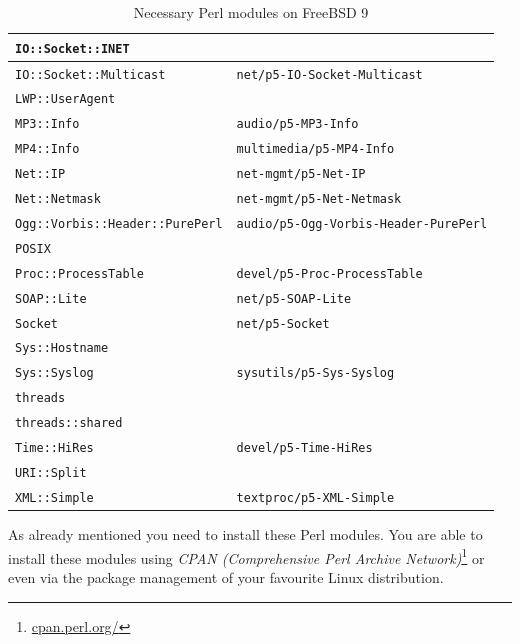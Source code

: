 \documentclass[a4paper,oneside,10pt]{report}
\begin{document}
\begin{table}
\begin{tabular}{|p{15em}|p{18em}|}
		\hline
		\verb|IO::Socket::INET| 							& \\
		\hline
		\verb|IO::Socket::Multicast| 					& \verb|net/p5-IO-Socket-Multicast| \\
		\hline
		\verb|LWP::UserAgent| 								& \\
		\hline
		\verb|MP3::Info| 											& \verb|audio/p5-MP3-Info| \\
		\hline
		\verb|MP4::Info| 											& \verb|multimedia/p5-MP4-Info| \\
		\hline
		\verb|Net::IP| 												& \verb|net-mgmt/p5-Net-IP| \\
		\hline
		\verb|Net::Netmask| 									& \verb|net-mgmt/p5-Net-Netmask| \\
		\hline
		\verb|Ogg::Vorbis::Header::PurePerl|	& \verb|audio/p5-Ogg-Vorbis-Header-PurePerl| \\
		\hline
		\verb|POSIX| 													& \\
		\hline
		\verb|Proc::ProcessTable| 						& \verb|devel/p5-Proc-ProcessTable| \\
		\hline
		\verb|SOAP::Lite| 										& \verb|net/p5-SOAP-Lite| \\
		\hline
		\verb|Socket| 												& \verb|net/p5-Socket| \\
		\hline
		\verb|Sys::Hostname| 									& \\
		\hline
		\verb|Sys::Syslog| 										& \verb|sysutils/p5-Sys-Syslog| \\
		\hline
		\verb|threads| 												& \\
		\hline
		\verb|threads::shared| 								& \\
		\hline
		\verb|Time::HiRes|										& \verb|devel/p5-Time-HiRes| \\
		\hline
		\verb|URI::Split| 										& \\
		\hline
		\verb|XML::Simple| 										& \verb|textproc/p5-XML-Simple| \\
		\hline
	\end{tabular}
	\caption{Necessary Perl modules on FreeBSD 9}
	\label{tab:NecessaryPerlModulesFreeBSD9}
\end{table}

As already mentioned you need to install these Perl modules. You are able to install these modules using {\em CPAN (Comprehensive Perl Archive Network)}\footnote{\url{cpan.perl.org/}} or even via the package management of your favourite Linux distribution.
\end{document}
